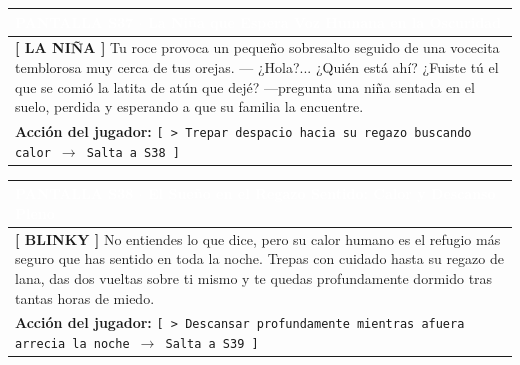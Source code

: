 \documentclass[11pt, a4paper]{article}
\begin{document}
\noindent
\begin{tabularx}{\textwidth}{|X|}
\hline
\rowcolor{colorExito}
\textbf{\textcolor{white}{PANTALLA S37 $\cdot$ La Niña que Espera}} \hfill \small\textcolor{white}{Voz Humana en la Oscuridad} \\ \hline
\rowcolor{colorTextoBox}
\textbf{\textcolor{colorEmisor}{[ LA NIÑA ]}} \vspace{0.2em}\newline
Tu roce provoca un pequeño sobresalto seguido de una vocecita temblorosa muy cerca de tus orejas. \newline
--- ¿Hola?... ¿Quién está ahí? ¿Fuiste tú el que se comió la latita de atún que dejé? ---pregunta una niña sentada en el suelo, perdida y esperando a que su familia la encuentre. \\ \hline
\rowcolor{colorBotonBox}
\textbf{Acción del jugador:} \newline
\texttt{[ > Trepar despacio hacia su regazo buscando calor $\rightarrow$ Salta a S38 ]} \\ \hline
\end{tabularx}

\vspace{1em}

\noindent
\begin{tabularx}{\textwidth}{|X|}
\hline
\rowcolor{colorExito}
\textbf{\textcolor{white}{PANTALLA S38 $\cdot$ El Sueño en el Regazo}} \hfill \small\textcolor{white}{Sentido: Calor y Descanso Pleno} \\ \hline
\rowcolor{colorTextoBox}
\textbf{\textcolor{colorEmisor}{[ BLINKY ]}} \vspace{0.2em}\newline
No entiendes lo que dice, pero su calor humano es el refugio más seguro que has sentido en toda la noche. Trepas con cuidado hasta su regazo de lana, das dos vueltas sobre ti mismo y te quedas profundamente dormido tras tantas horas de miedo. \\ \hline
\rowcolor{colorBotonBox}
\textbf{Acción del jugador:} \newline
\texttt{[ > Descansar profundamente mientras afuera arrecia la noche $\rightarrow$ Salta a S39 ]} \\ \hline
\end{tabularx}

\vspace{1em}
\end{document}
